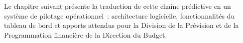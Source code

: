 Le chapitre suivant pr\'esente la traduction de cette cha\^ine pr\'edictive en un
syst\`eme de pilotage op\'erationnel~: architecture logicielle, fonctionnalit\'es
du tableau de bord et apports attendus pour la Division de la Pr\'evision
et de la Programmation financi\`ere de la Direction du Budget.
